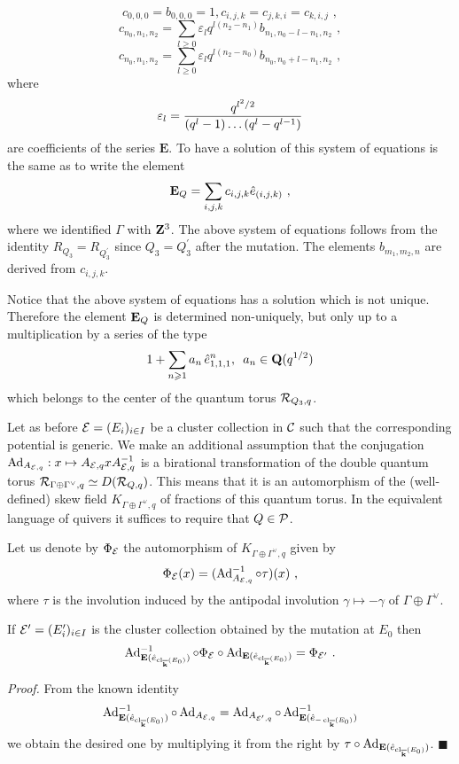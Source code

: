 \documentclass[12pt]{article}
\begin{document}
$$c_{0,0,0}=b_{0,0,0}=1, c_{i,j,k}=c_{j,k,i}=c_{k,i,j}\,\,,$$
$$c_{n_0,n_1,n_2}=\sum_{l\geqslant 0}\varepsilon_lq^{l(n_2-n_1)}b_{n_1,n_0-l-n_1,n_2}\,\,,$$
$$c_{n_0,n_1,n_2}=\sum_{l\geqslant 0}\varepsilon_lq^{l(n_2-n_0)}b_{n_0,n_0+l-n_1,n_2}\,\,,$$
where
$$\varepsilon_l={q^{l^2/2}\over{(q^l-1)\dots(q^l-q^{l-1})}}$$
are coefficients of the series $\mathbf{E}$.
To have a solution of this system of equations is the same as to write the element
$${\bf E}_Q=\sum_{i,j,k}c_{i,j,k}\hat{e}_{(i,j,k)}\,\,,$$
where  we identified $\Gamma$ with ${\bf Z}^3$.
The above system of equations follows from the identity $R_{Q_3}=R_{Q_3^{\prime}}$ since $Q_3=Q_3^{\prime}$ after the mutation. The elements $b_{m_1,m_2,n}$ are derived from $c_{i,j,k}$.

Notice that the above system of equations has a solution which is not unique. Therefore the element ${\bf E}_Q$ is determined  non-uniquely, but only up to a multiplication by a series of the type $$1+\sum_{n\geqslant 1}a_n\,\hat{e}_{1,1,1}^n,\,\,\, a_n\in {\bf Q}(q^{1/2})$$ which belongs to the center of the quantum torus ${\cal R}_{Q_3,q}$.


Let as before ${\cal E}=(E_i)_{i\in I}$ be a cluster collection in ${\mathcal C}$ such that the corresponding potential is generic.  We make an additional assumption that the conjugation $\operatorname{Ad}_{A_{{\cal E},q}}:x\mapsto A_{{\cal E},q}xA_{{\cal E},q}^{-1}$ is a birational transformation of the double quantum torus ${\cal R}_{\Gamma\oplus \Gamma^{\vee},q}\simeq D({\cal R}_{Q,q})$.
This means that it is an automorphism of the (well-defined) skew field $K_{\Gamma\oplus \Gamma^{\vee},q}$ of fractions of this quantum torus. In the equivalent language of quivers it suffices to require that $Q\in {\cal P}$.

Let us denote by $\Phi_{\cal E}$ the automorphism of $K_{\Gamma\oplus \Gamma^{\vee},q}$ given by
$$\Phi_{\cal E}(x)=(\operatorname{Ad}_{A_{{\cal E},q}}^{-1}\circ \tau)(x)\,\,,$$
where $\tau$ is the involution induced by the antipodal involution $\gamma\mapsto -\gamma$ of $\Gamma\oplus \Gamma^{\vee}$.

\begin{prp} If ${\cal E}^{\prime}=(E_i^{\prime})_{i\in I}$ is the cluster collection obtained by the mutation at $E_0$ then
$$\operatorname{Ad}_{{\bf E}(\hat{e}_{\operatorname{cl}_{{\overline{\bf k}}}(E_0)})}^{-1}\circ\Phi_{\cal E}\circ \operatorname{Ad}_{{\bf E}(\hat{e}_{\operatorname{cl}_{{\overline{\bf k}}}(E_0)})}=\Phi_{{\cal E}^{\prime}}\,\,.$$


\end{prp}

{\it Proof.} From the known identity
$$\operatorname{Ad}_{{\bf E}(\hat{e}_{\operatorname{cl}_{{\overline{\bf k}}}(E_0)})}^{-1}\circ \operatorname{Ad}_{A_{{\cal E},q}}=\operatorname{Ad}_{A_{{\cal E}^{\prime},q}}
\circ \operatorname{Ad}_{{\bf E}(\hat{e}_{-\operatorname{cl}_{{\overline{\bf k}}}(E_0)})}^{-1}$$
we obtain the desired one by multiplying it from the right by $\tau\circ \operatorname{Ad}_{{\bf E}(\hat{e}_{\operatorname{cl}_{{\overline{\bf k}}}(E_0)})}$. $\blacksquare$
\end{document}
